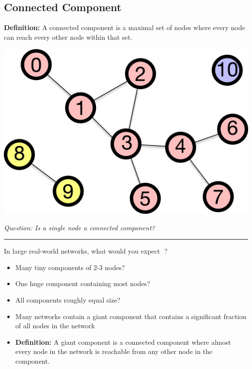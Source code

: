 \documentclass[
  letterpaper,
  DIV=11,
  numbers=noendperiod,
  oneside]{scrartcl}
\providecommand{\tightlist}{%
  \setlength{\itemsep}{0pt}\setlength{\parskip}{0pt}}
\begin{document}
\subsection{Connected Component}\label{connected-component}

\textbf{Definition:} {A connected component} is a maximal set of nodes
where every node can reach every other node within that set.

\begin{center}
\includegraphics[width=1\linewidth,height=\textheight,keepaspectratio]{./connected-component.jpg}
\end{center}

\emph{Question: Is a single node a connected component?}

\begin{center}\rule{0.5\linewidth}{0.5pt}\end{center}

In large real-world networks, what would you expect 🤔?

\begin{itemize}
\tightlist
\item
  Many tiny components of 2-3 nodes?
\item
  One huge component containing most nodes?
\item
  All components roughly equal size?
\end{itemize}

\begin{itemize}
\tightlist
\item
  Many networks contain {a giant component} that contains a significant
  fraction of all nodes in the network
\item
  \textbf{Definition:} {A giant component} is a connected component
  where almost every node in the network is reachable from any other
  node in the component.
\end{itemize}
\end{document}
